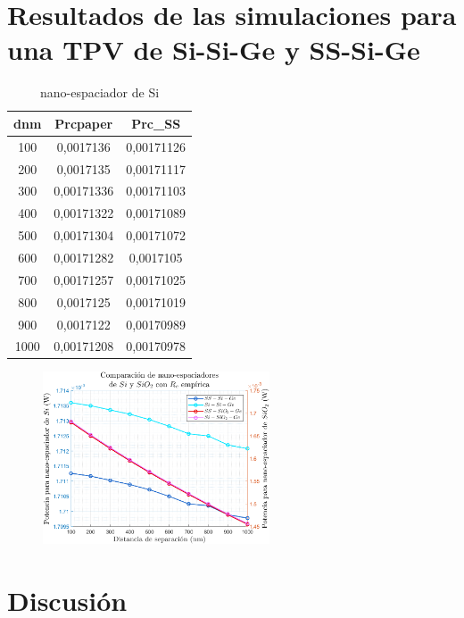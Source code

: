 \section{Resultados de las simulaciones para una TPV de Si-Si-Ge y SS-Si-Ge}
\begin{table}[H]
	\centering
		\begin{tabular}{|c|c|c|}
		\hline
		dnm&Prcpaper&Prc\_SS\\ \hline 
		100&0,0017136&0,00171126\\ \hline 
		200&0,0017135&0,00171117\\ \hline 
		300&0,00171336&0,00171103\\ \hline 
		400&0,00171322&0,00171089\\ \hline 
		500&0,00171304&0,00171072\\ \hline 
		600&0,00171282&0,0017105\\ \hline 
		700&0,00171257&0,00171025\\ \hline 
		800&0,0017125&0,00171019\\ \hline 
		900&0,0017122&0,00170989\\ \hline 
		1000&0,00171208&0,00170978\\ \hline
		\end{tabular}
	\caption{nano-espaciador de Si}
	\label{tab:nanoEspaciadorDeSi}
\end{table}
\begin{figure}[H]
	\centering
		\includegraphics[width=0.6\textwidth]{figuras/Resultados/conduccion/relaciones_SiySiO2.png}
	\caption{ }
	\label{fig:relaciones_SiySiO2}
\end{figure}

\section{Discusión}